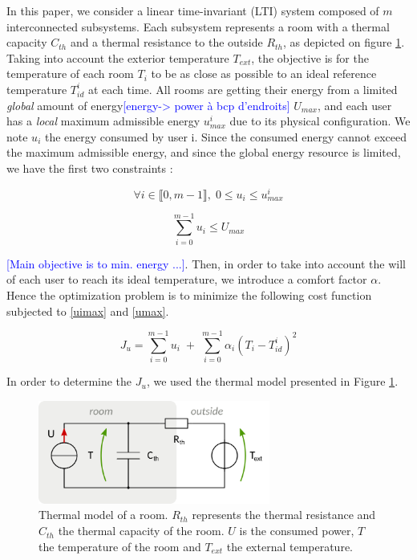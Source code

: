 \documentclass[conference]{IEEEtran}
\newcommand{\rem}[1]{\textcolor{blue}{[#1]}}
\begin{document}
In this paper, we consider a linear time-invariant (LTI) system composed of $m$ interconnected subsystems. Each subsystem represents a room with a thermal capacity $C_{th}$ and a thermal resistance to the outside $R_{th}$, as depicted on figure \ref{thermmod}.
Taking into account the exterior temperature $T_{ext}$, the objective is for the temperature of each room $T_i$ to be as close as possible to an ideal reference temperature $T_{id}^i$ at each time. All rooms are getting their energy from a limited \emph{global} amount of energy\rem{energy-> power à bcp d'endroits} $U_{max}$, and each user has a \emph{local} maximum  admissible energy $u_{max}^i$ due to its physical configuration. We note $u_i$ the energy consumed by user i. Since the consumed energy cannot exceed the maximum admissible energy, and since the global energy resource is limited, we have the first two constraints :

\begin{equation}
\forall i \in \llbracket 0, m-1 \rrbracket, \; 0 \leq  u_i \leq  u_{max}^i 
\label{uimax}
\end{equation}

\begin{equation}
\sum_{i = 0}^{m-1} u_i \leq U_{max}
\label{umax}
\end{equation}

\rem{Main objective is to min. energy ...}. Then, in order to take into account the will of each user to reach its ideal temperature, we introduce a comfort factor $\alpha$.  Hence the optimization problem is to minimize the following cost function subjected to \ref{uimax} and \ref{umax}.

\begin{equation}
J_u = \sum_{i = 0}^{m-1} u_i  \; + \; \sum_{i = 0}^{m-1} \alpha_i (T_i - T_{id}^i)^2 
\label{cost}
\end{equation}

In order to determine the $J_u$, we used the thermal model presented in Figure \ref{thermmod}.

\begin{figure}[!t]
\centering
\includegraphics[width=3in]{therm_diagram.png}
\caption{Thermal model of a room. $R_{th}$ represents the thermal resistance and $C_{th}$ the thermal capacity of the room. $U$ is the consumed power, $T$ the temperature of the room and $T_{ext}$ the external temperature.}
\label{thermmod}
\end{figure}
\end{document}
